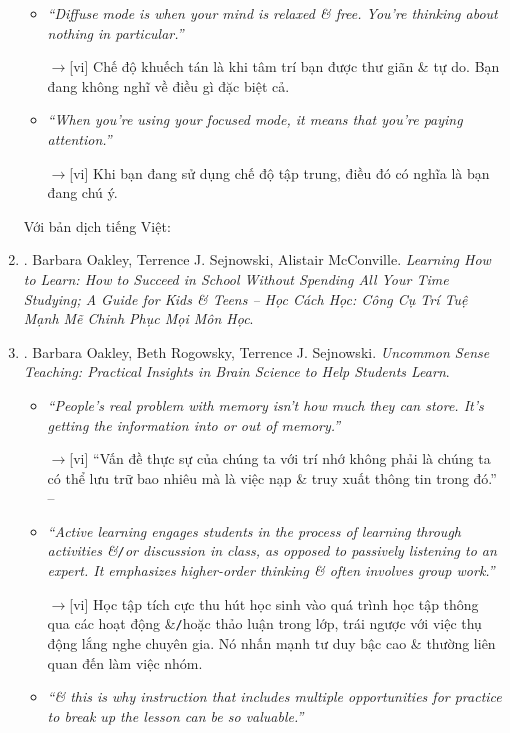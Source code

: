 \documentclass[12pt,twoside]{book}
\begin{document}
\begin{enumerate}
\begin{itemize}
		\item {\it``Diffuse mode is when your mind is relaxed \& free. You're thinking about nothing in particular.''}
		
		{\sf[en]$\to$[vi]} Chế độ khuếch tán là khi tâm trí bạn được thư giãn \& tự do. Bạn đang không nghĩ về điều gì đặc biệt cả.
		
		\item {\it``When you're using your focused mode, it means that you're paying attention.''}
		
		{\sf[en]$\to$[vi]} Khi bạn đang sử dụng chế độ tập trung, điều đó có nghĩa là bạn đang chú ý.
	\end{itemize}
	Với bản dịch tiếng Việt:
	\item \cite{Oakley_Sejnowski_McConville_learn_how_learn_VN}. {\sc Barbara Oakley, Terrence J. Sejnowski, Alistair McConville}. {\it Learning How to Learn: How to Succeed in School Without Spending All Your Time Studying; A Guide for Kids \& Teens -- Học Cách Học: Công Cụ Trí Tuệ Mạnh Mẽ Chinh Phục Mọi Môn Học}.
	\item \cite{Oakley_Rogowsky_Sejnowski_McConville_uncommon_sense_teaching}. {\sc Barbara Oakley, Beth Rogowsky, Terrence J. Sejnowski}. {\it Uncommon Sense Teaching: Practical Insights in Brain Science to Help Students Learn}.
	\begin{itemize}
		\item {\it``People's real problem with memory isn't how much they can store. It's getting the information into or out of memory.''}
		
		{\sf[en]$\to$[vi]} ``Vấn đề thực sự của chúng ta với trí nhớ không phải là chúng ta có thể lưu trữ bao nhiêu mà là việc nạp \& truy xuất thông tin trong đó.'' -- \cite[p. 19]{Oakley_Rogowsky_Sejnowski_McConville_uncommon_sense_teaching_VN}
		
		\item {\it``Active learning engages students in the process of learning through activities \&{\tt/}or discussion in class, as opposed to passively listening to an expert. It emphasizes higher-order thinking \& often involves group work.''}
		
		{\sf[en]$\to$[vi]} Học tập tích cực thu hút học sinh vào quá trình học tập thông qua các hoạt động \&{\tt/}hoặc thảo luận trong lớp, trái ngược với việc thụ động lắng nghe chuyên gia. Nó nhấn mạnh tư duy bậc cao \& thường liên quan đến làm việc nhóm.
		
		\item {\it``\& this is why instruction that includes multiple opportunities for practice to break up the lesson can be so valuable.''}
		

\end{itemize}
\end{enumerate}
\end{document}
